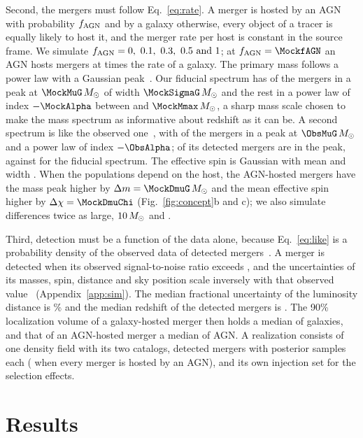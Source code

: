 \documentclass[aps,prd,reprint,amsmath,amssymb,nofootinbib]{revtex4-2}
\newcommand{\Msun}{\,M_\odot}
\newcommand{\fAGN}{f_{\rm AGN}}
\begin{document}
Second, the mergers must follow Eq.~\eqref{eq:rate}.
A merger is hosted by an AGN with probability $\fAGN$ and by a galaxy otherwise, every object of a tracer is equally likely to host it, and the merger rate per host is constant in the source frame.
We simulate $\fAGN=\IndfList$; at $\fAGN=\MockfAGN$ an AGN hosts mergers at \MockRateRatio{} times the rate of a galaxy.
The primary mass follows a power law with a Gaussian peak~\cite{Talbot:2018cva}.
Our fiducial spectrum has \MockPeakFrac{} of the mergers in a peak at $\MockMuG\Msun$ of width $\MockSigmaG\Msun$ and the rest in a power law of index $-\MockAlpha$ between \MockMmin{} and $\MockMmax\Msun$, a sharp mass scale chosen to make the mass spectrum as informative about redshift as it can be.
A second spectrum is like the observed one~\cite{KAGRA:2021duu}, with \ObsPeakFrac{} of the mergers in a peak at $\ObsMuG\Msun$ and a power law of index $-\ObsAlpha$; \ObsDetPeakShare{} of its detected mergers are in the peak, against \MockDetPeakShare{} for the fiducial spectrum.
The effective spin is Gaussian with mean \MockMuChi{} and width \MockSigmaChi.
When the populations depend on the host, the AGN-hosted mergers have the mass peak higher by $\Delta m=\MockDmuG\Msun$ and the mean effective spin higher by $\Delta\chi=\MockDmuChi$ (Fig.~\ref{fig:concept}b and c); we also simulate differences twice as large, $\IndDmTwice\Msun$ and \IndDchiTwice.

Third, detection must be a function of the data alone, because Eq.~\eqref{eq:like} is a probability density of the observed data of detected mergers~\cite{Essick:2023upv}.
A merger is detected when its observed signal-to-noise ratio exceeds \MockSNRthr, and the uncertainties of its masses, spin, distance and sky position scale inversely with that observed value~\cite{Farah:2023vsc} (Appendix~\ref{app:sim}).
The median fractional uncertainty of the luminosity distance is \MockSigLnDL\% and the median redshift of the detected mergers is \MockzMedian.
The 90\% localization volume of a galaxy-hosted merger then holds a median of \PureGalHostsPerVol{} galaxies, and that of an AGN-hosted merger a median of \PureAGNHostsPerVol{} AGN.
A realization consists of one density field with its two catalogs, \MockNev{} detected mergers with \ProdNsamp{} posterior samples each (\MCNsampHi{} when every merger is hosted by an AGN), and its own injection set for the selection effects.

\section{Results}
\label{sec:results}
\end{document}
